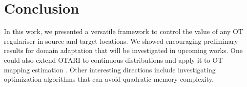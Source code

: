 \section{Conclusion}

In this work, we presented a versatile framework to control the value of any OT regulariser in source and target locations. We showed encouraging preliminary results for domain adaptation that will be investigated in upcoming works. One could also extend OTARI to continuous distributions and apply it to OT mapping
estimation \cite{pooladian2021entropic}. Other interesting directions include
investigating optimization algorithms that can avoid quadratic memory complexity.

